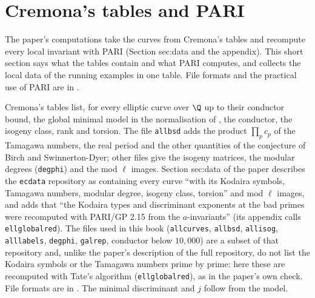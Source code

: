 \section{Cremona's tables and PARI}\label{sec:reduction:tables}

The paper's computations take the curves from Cremona's tables and recompute every local invariant with PARI (Section
sec:data and the appendix). This short section says what the tables contain and what PARI computes, and collects the local
data of the running examples in one table. File formats and the practical use of PARI are in .

\begin{remark}\label{rem:reduction:cremona-tables}
Cremona's tables \cite{Cremona97,ecdata} list, for every elliptic curve over $\Q$ up to their conductor bound, the global minimal model
in the normalisation of , the conductor, the isogeny class, rank and torsion. The file
\texttt{allbsd} adds the product $\prod_pc_p$ of the Tamagawa numbers, the real period and the other quantities of the conjecture of Birch
and Swinnerton-Dyer; other files give the isogeny matrices, the modular degrees (\texttt{degphi}) and the mod $\ell$ images. Section
sec:data of the paper describes the \texttt{ecdata} repository as containing every curve ``with its Kodaira symbols, Tamagawa
numbers, modular degree, isogeny class, torsion'' and mod $\ell$ images, and adds that ``the Kodaira types and discriminant exponents
at the bad primes were recomputed with PARI/GP 2.15 from the $a$-invariants'' (its appendix calls \texttt{ellglobalred}). The files
used in this book (\texttt{allcurves}, \texttt{allbsd}, \texttt{allisog}, \texttt{alllabels}, \texttt{degphi}, \texttt{galrep},
conductor below $10{,}000$) are a subset of that repository and, unlike the paper's description of the full repository, do not list
the Kodaira symbols or the Tamagawa numbers prime by prime: here these are recomputed with Tate's algorithm (\texttt{ellglobalred}),
as in the paper's own check. File formats are in . The minimal discriminant and $j$ follow from the model.
\end{remark}

